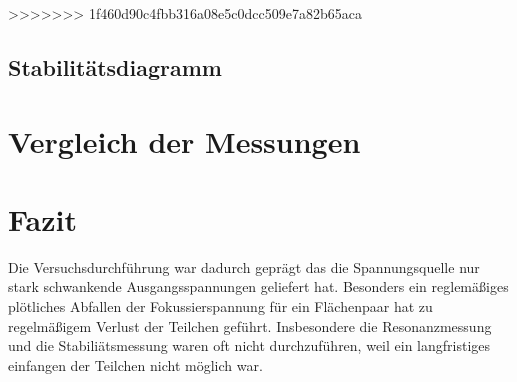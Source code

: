 \documentclass[a4paper,12pt]{article}
\begin{document}
>>>>>>> 1f460d90c4fbb316a08e5c0dcc509e7a82b65aca

\subsection{Stabilitätsdiagramm}

\section{Vergleich der Messungen}

\section{Fazit}
Die Versuchsdurchführung war dadurch geprägt das die Spannungsquelle nur stark schwankende Ausgangsspannungen geliefert hat. Besonders ein reglemäßiges plötliches Abfallen der Fokussierspannung für ein 
Flächenpaar hat zu regelmäßigem Verlust der Teilchen geführt. Insbesondere die Resonanzmessung und die Stabiliätsmessung waren oft nicht durchzuführen, weil ein langfristiges einfangen der Teilchen nicht
möglich war.

\end{document}
